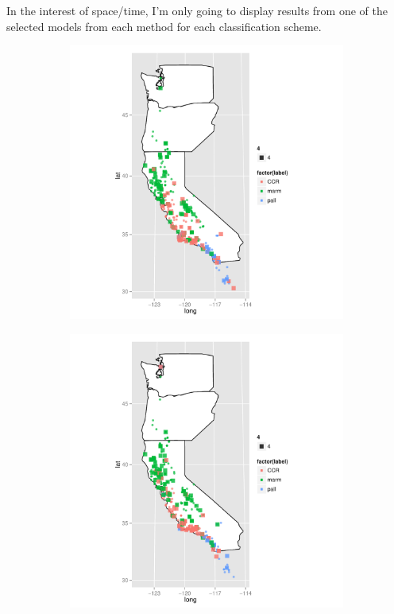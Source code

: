 \documentclass{article}\usepackage{graphicx, color}
\begin{document}
In the interest of space/time, I'm only going to display results from one of the selected models from each method for each classification scheme.




\begin{figure}[t]
  \centering
  \begin{subfigure}[b]{0.5\textwidth}
    \centering
    \caption{}
    \includegraphics[width = \textwidth]{figure/multi-map1}
    \label{fig:multi-map1}
  \end{subfigure}%
  \begin{subfigure}[b]{0.5\textwidth}
    \centering
    \caption{}
    \includegraphics[width = \textwidth]{figure/multi-map2}
    \label{fig:multi-map2}
  \end{subfigure}\\


\end{figure}
\end{document}
